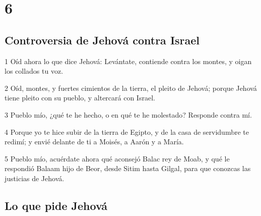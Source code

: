 \chapter{6}

\section*{Controversia de Jehová contra Israel}

\par 1 Oíd ahora lo que dice Jehová: Levántate, contiende contra los montes, y oigan los collados tu voz.
\par 2 Oíd, montes, y fuertes cimientos de la tierra, el pleito de Jehová; porque Jehová tiene pleito con su pueblo, y altercará con Israel.
\par 3 Pueblo mío, ¿qué te he hecho, o en qué te he molestado? Responde contra mí.
\par 4 Porque yo te hice subir de la tierra de Egipto, y de la casa de servidumbre te redimí; y envié delante de ti a Moisés, a Aarón y a María. 
\par 5 Pueblo mío, acuérdate ahora qué aconsejó Balac rey de Moab, y qué le respondió Balaam hijo de Beor, desde Sitim hasta Gilgal, para que conozcas las justicias de Jehová.

\section*{Lo que pide Jehová}

